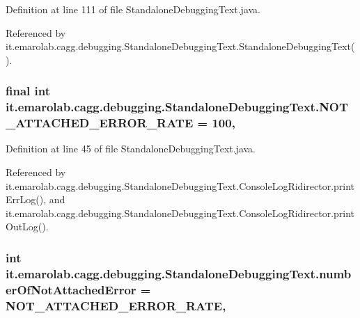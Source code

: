 Definition at line 111 of file Standalone\-Debugging\-Text.\-java.



Referenced by it.\-emarolab.\-cagg.\-debugging.\-Standalone\-Debugging\-Text.\-Standalone\-Debugging\-Text().

\hypertarget{classit_1_1emarolab_1_1cagg_1_1debugging_1_1StandaloneDebuggingText_a2bc49514390e3f0fa6612a5bda61264e}{
\subsubsection[{N\-O\-T\-\_\-\-A\-T\-T\-A\-C\-H\-E\-D\-\_\-\-E\-R\-R\-O\-R\-\_\-\-R\-A\-T\-E}]{\setlength{\rightskip}{0pt plus 5cm}final int it.\-emarolab.\-cagg.\-debugging.\-Standalone\-Debugging\-Text.\-N\-O\-T\-\_\-\-A\-T\-T\-A\-C\-H\-E\-D\-\_\-\-E\-R\-R\-O\-R\-\_\-\-R\-A\-T\-E = 100\hspace{0.3cm}{\ttfamily [static]}, {\ttfamily [private]}}}\label{classit_1_1emarolab_1_1cagg_1_1debugging_1_1StandaloneDebuggingText_a2bc49514390e3f0fa6612a5bda61264e}


Definition at line 45 of file Standalone\-Debugging\-Text.\-java.



Referenced by it.\-emarolab.\-cagg.\-debugging.\-Standalone\-Debugging\-Text.\-Console\-Log\-Ridirector.\-print\-Err\-Log(), and it.\-emarolab.\-cagg.\-debugging.\-Standalone\-Debugging\-Text.\-Console\-Log\-Ridirector.\-print\-Out\-Log().

\hypertarget{classit_1_1emarolab_1_1cagg_1_1debugging_1_1StandaloneDebuggingText_a76c9558556e26023809b47c76c1527ed}{
\subsubsection[{number\-Of\-Not\-Attached\-Error}]{\setlength{\rightskip}{0pt plus 5cm}int it.\-emarolab.\-cagg.\-debugging.\-Standalone\-Debugging\-Text.\-number\-Of\-Not\-Attached\-Error = {\bf N\-O\-T\-\_\-\-A\-T\-T\-A\-C\-H\-E\-D\-\_\-\-E\-R\-R\-O\-R\-\_\-\-R\-A\-T\-E}\hspace{0.3cm}{\ttfamily [static]}, {\ttfamily [private]}}}\label{classit_1_1emarolab_1_1cagg_1_1debugging_1_1StandaloneDebuggingText_a76c9558556e26023809b47c76c1527ed}


